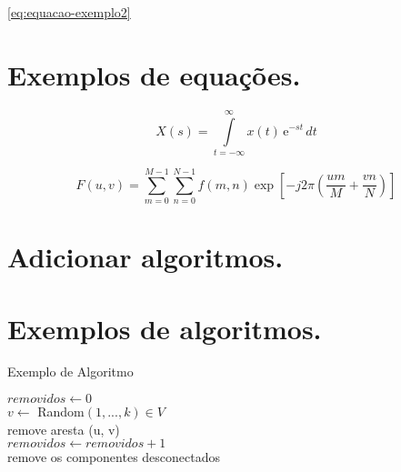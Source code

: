 \ref{eq:equacao-exemplo2}

\section{Exemplos de equações.}

\begin{equation}
    X(s) = \int\limits_{t = -\infty}^{\infty} x(t) \, \text{e}^{-st} \, dt
    \label{eq:equacao-exemplo1}
\end{equation}

\begin{equation}
    F(u, v) = \sum_{m = 0}^{M - 1} \sum_{n = 0}^{N - 1} f(m, n) \exp \left[ -j 2 \pi \left( \frac{u m}{M} + \frac{v n}{N} \right) \right]
    \label{eq:equacao-exemplo2}
\end{equation}



\section{Adicionar algoritmos.}



\section{Exemplos de algoritmos.}

\begin{algorithm}
    \caption{Exemplo de Algoritmo}
    $removidos \leftarrow 0$ \\
     {
        $v \leftarrow$ Random$(1, ..., k) \in V$ \\
             {
                remove aresta (u, v)\\
                $removidos \leftarrow removidos + 1$\\
            }
             {
                remove os componentes desconectados\\
            }
        }
\end{algorithm}


